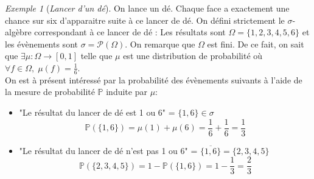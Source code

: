 \documentclass[12pt,a4paper]{report}
\theoremstyle{definition}%
\theoremstyle{remark}
\newtheorem{example}{Exemple}[chapter]
\newcommand{\ie}{\textit{i.e.}, }
\newcommand{\pr}{\mathbb{P}}
\let\labelitemi\labelitemii
\begin{document}
\begin{example}[\textit{Lancer d'un dé}]
	On lance un dé. Chaque face a exactement une chance sur six d'apparaitre suite à ce lancer de dé. On défini strictement le $\sigma$-algèbre correspondant à ce lancer de dé : 
	Les résultats sont $\Omega = \{1, 2, 3, 4, 5, 6\}$ et les évènements sont $\sigma = \mathcal{P}(\Omega)$.
	On remarque que $\Omega$ est fini.
	De ce fait, on sait que $\exists \mu: \Omega \rightarrow [0,1]$ telle que $\mu$ est une distribution de probabilité
	où $\forall f \in \Omega, \; \mu(f) = \frac{1}{6}$.\\
	On est à présent intéressé par la probabilité des évènements suivants à l'aide de la mesure de probabilité $\pr$ induite par $\mu$:
	\begin{itemize}
		\renewcommand{\labelitemi}{\tiny$\bullet$}
		\item "Le résultat du lancer de dé est 1 ou 6" = $\{1, 6\} \in \sigma$
		\[\pr(\{1,6\}) = \mu(1) + \mu(6) = \frac{1}{6} + \frac{1}{6} = \frac{1}{3}\]
		\item "Le résultat du lancer de dé n'est pas 1 ou 6" = $\overline{\{1, 6\}} = \{2, 3, 4, 5\}$
		\[\pr(\{2, 3, 4, 5\}) = 1 - \pr(\{1, 6\}) = 1 - \frac{1}{3} = \frac{2}{3}\]
	\end{itemize}
\end{example}

\end{document}
